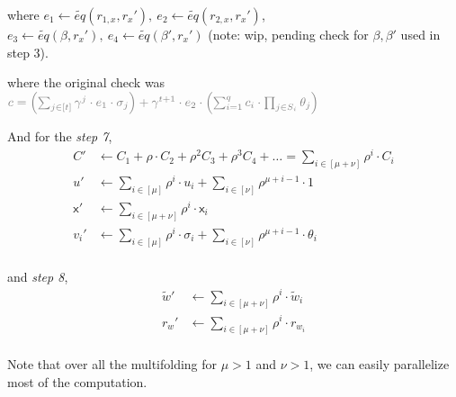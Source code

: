 \documentclass{article}
\theoremstyle{definition}
\begin{document}
where
$e_1 \leftarrow \widetilde{eq}(r_{1,x}, r_x'),~ e_2 \leftarrow \widetilde{eq}(r_{2,x}, r_x')$, $e_3 \leftarrow \widetilde{eq}(\beta, r_x'),~ e_4 \leftarrow \widetilde{eq}(\beta', r_x')$ (note: wip, pending check for $\beta, \beta'$ used in step 3).

\vspace{0.5cm}


where the original check was\\
$\textcolor{gray}{c = \left(\sum_{j \in [t]} \gamma^j \cdot e_1 \cdot \sigma_j \right) + \gamma^{t+1} \cdot e_2 \cdot \left( \sum_{i=1}^q c_i \cdot \prod_{j \in S_i} \theta_j \right)}$


\vspace{0.5cm}

And for the \emph{step 7},
\begin{align*}
	C' &\leftarrow C_1 + \rho \cdot C_2 + \rho^2 C_3 + \rho^3 C_4 + \ldots = \sum_{i \in [\mu + \nu]} \rho^i \cdot C_i \\
	u' &\leftarrow \sum_{i \in [\mu]} \rho^i \cdot u_i + \sum_{i \in [\nu]} \rho^{\mu + i-1} \cdot 1\\
	\mathsf{x}' &\leftarrow \sum_{i \in [\mu+\nu]} \rho^i \cdot \mathsf{x}_i\\
	v_i' &\leftarrow \sum_{i \in [\mu]} \rho^i \cdot \sigma_i + \sum_{i \in [\nu]} \rho^{\mu + i-1} \cdot \theta_i\\
\end{align*}

and \emph{step 8},
\begin{align*}
	\widetilde{w}' &\leftarrow \sum_{i \in [\mu+\nu]} \rho^i\cdot \widetilde{w}_i\\
	r_w' &\leftarrow \sum_{i \in [\mu+\nu]} \rho^i \cdot r_{w_i}\\
\end{align*}


Note that over all the multifolding for $\mu >1$ and $\nu>1$, we can easily parallelize most of the computation.
\end{document}

